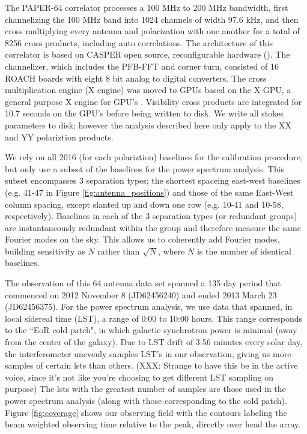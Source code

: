 \documentclass[twocolumn,numberedappendix]{emulateapj} \shorttitle{PSA64}
\begin{document}
The PAPER-64 correlator processes a 100 MHz to 200 MHz bandwidth, first
channelizing the 100 MHz band into 1024 channels of width 97.6 kHz, and then
cross multiplying every antenna and polarization with one another for a total of
8256 cross products, including auto correlations. The architecture of this
correlator is based on CASPER open source, reconfigurable hardware
(\cite{parsons_et_al2008}). The channelizer, which includes the PFB-FFT and
corner turn, consisted of 16 ROACH boards with eight 8 bit analog to digital
converters. The cross multiplication engine (X engine) was moved to GPUs based
on the X-GPU, a general purpose X engine for GPU's \citep{clark_et_al2013}. 
Visibility cross products are integrated for 10.7 seconds on the GPU's before
being written to disk. We write all stokes parameters to disk; however the
analysis described here only apply to the XX and YY polariztion products.

We rely on all 2016 (for each polariztion) baselines for the calibration
procedure, but only use a subset of the baselines for the power spectrum
analysis. This subset encompasses 3 separation types; the shortest spaceing
east-west baselines (e.g. 41-47 in Figure \ref{fig:antenna_positions}) and those of the same East-West column spacing,
except slanted up and down one row (e.g. 10-41 and 10-58, respectively).
Baselines in each of the 3 separation types (or redundant groups) are
instantaneously redundant within the group and therefore measure the same
Fourier modes on the sky. This allows us to coherently add Fourier modes,
building sensitivity as $N$ rather than $\sqrt{N}$, where $N$ is the number of identical baselines.

The observation of this 64 antenna data set spanned a 135 day period that
commenced on 2012 November 8 (JD62456240) and ended  2013 March 23 (JD62456375). 
For the power spectrum analysis, we use data that spanned, in local sidereal
time (LST), a range of 0:00 to 10:00 hours. This range corresponds to
the ``EoR cold patch", in which galactic synchrotron power is minimal (away from
the center of the galaxy). Due to LST drift of 3:56 minutes every solar day, the interferometer
unevenly samples LST's in our observation, giving us more samples of certain
lsts than others. (XXX: Strange to have this be in the active voice, since 
it's not like you're choosing to get different LST sampling on purpose)
The lsts with the greatest number of samples are those used in
the power spectrum analysis (along with those corresponding to the cold patch).
Figure \ref{fig:coverage} shows our observing field with the contours labeling
the beam weighted observing time relative to the peak, directly over head the
array.
\end{document}
